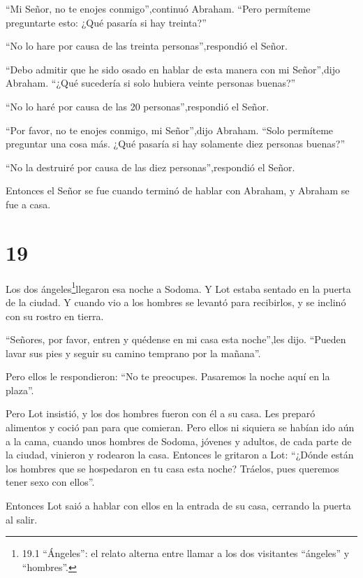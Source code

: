  ``Mi Señor, no te enojes conmigo'',continuó Abraham.
``Pero permíteme preguntarte esto: ¿Qué pasaría si hay treinta?''

``No lo hare por causa de las treinta personas'',respondió el Señor.

 ``Debo admitir que he sido osado en hablar de esta manera
con mi Señor'',dijo Abraham. ``¿Qué sucedería si solo hubiera veinte
personas buenas?''

``No lo haré por causa de las 20 personas'',respondió el Señor.

 ``Por favor, no te enojes conmigo, mi Señor'',dijo
Abraham. ``Solo permíteme preguntar una cosa más. ¿Qué pasaría si hay
solamente diez personas buenas?''

``No la destruiré por causa de las diez personas'',respondió el Señor.

 Entonces el Señor se fue cuando terminó de hablar con
Abraham, y Abraham se fue a casa.

\hypertarget{section-18}{%
\section{19}\label{section-18}}

 Los dos ángeles\footnote{19.1 ``Ángeles'': el relato
  alterna entre llamar a los dos visitantes ``ángeles'' y ``hombres''.}llegaron
esa noche a Sodoma. Y Lot estaba sentado en la puerta de la ciudad. Y
cuando vio a los hombres se levantó para recibirlos, y se inclinó con su
rostro en tierra.

 ``Señores, por favor, entren y quédense en mi casa esta
noche'',les dijo. ``Pueden lavar sus pies y seguir su camino temprano
por la mañana''.

Pero ellos le respondieron: ``No te preocupes. Pasaremos la noche aquí
en la plaza''.

 Pero Lot insistió, y los dos hombres fueron con él a su
casa. Les preparó alimentos y coció pan para que comieran. 
Pero ellos ni siquiera se habían ido aún a la cama, cuando unos hombres
de Sodoma, jóvenes y adultos, de cada parte de la ciudad, vinieron y
rodearon la casa.  Entonces le gritaron a Lot: ``¿Dónde
están los hombres que se hospedaron en tu casa esta noche? Tráelos, pues
queremos tener sexo con ellos''.

 Entonces Lot saió a hablar con ellos en la entrada de su
casa, cerrando la puerta al salir.

